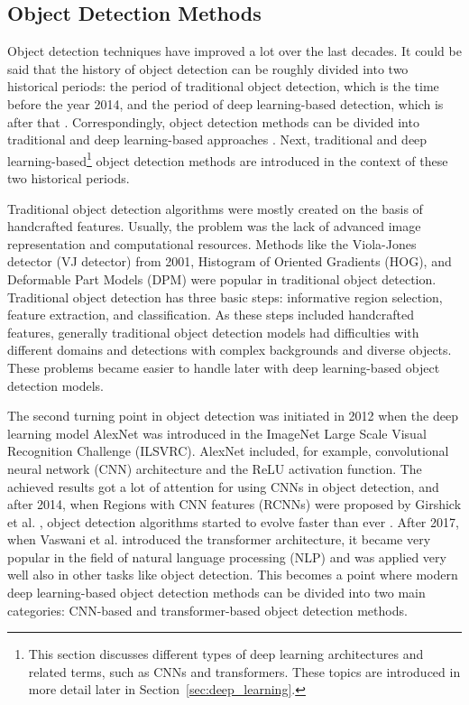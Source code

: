 \subsection{Object Detection Methods}
\label{sec:object_detection_methods}
Object detection techniques have improved a lot over the last decades. It could be said that the history of object detection can be roughly divided into two historical periods: the period of traditional object detection, which is the time before the year 2014, and the period of deep learning-based detection, which is after that \cite{object_detection_20years}. Correspondingly, object detection methods can be divided into traditional and deep learning-based approaches \cite{object_detection_review}. Next, traditional and deep learning-based\footnote{This section discusses different types of deep learning architectures and related terms, such as CNNs and transformers. These topics are introduced in more detail later in Section~\ref{sec:deep_learning}.} object detection methods are introduced in the context of these two historical periods.

Traditional object detection algorithms were mostly created on the basis of handcrafted features. Usually, the problem was the lack of advanced image representation and computational resources. Methods like the Viola-Jones detector (VJ detector) from 2001, Histogram of Oriented Gradients (HOG), and Deformable Part Models (DPM) were popular in traditional object detection. \cite{object_detection_review, object_detection_20years} Traditional object detection has three basic steps: informative region selection, feature extraction, and classification. As these steps included handcrafted features, generally traditional object detection models had difficulties with different domains and detections with complex backgrounds and diverse objects. \cite{SUN2024108458} These problems became easier to handle later with deep learning-based object detection models.

The second turning point in object detection was initiated in 2012 when the deep learning model AlexNet \cite{alexnet} was introduced in the ImageNet Large Scale Visual Recognition Challenge (ILSVRC). AlexNet included, for example, convolutional neural network (CNN) architecture and the ReLU activation function. The achieved results got a lot of attention for using CNNs in object detection, and after 2014, when Regions with CNN features (RCNNs) were proposed by Girshick et al. \cite{RCNN}, object detection algorithms started to evolve faster than ever \cite{object_detection_20years}. After 2017, when Vaswani et al. \cite{vaswani2023attentionneed} introduced the transformer architecture, it became very popular in the field of natural language processing (NLP) and was applied very well also in other tasks like object detection. This becomes a point where modern deep learning-based object detection methods can be divided into two main categories: CNN-based and transformer-based object detection methods. \cite{SUN2024108458}

